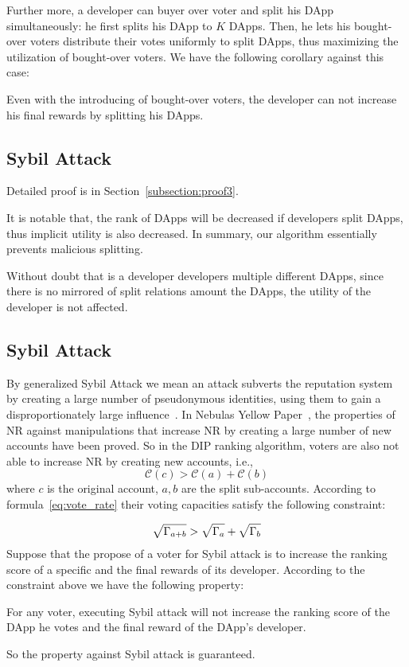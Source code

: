 Further more, a developer can buyer over voter and split his DApp simultaneously: he first splits his DApp to $K$ DApps. Then, he lets his bought-over voters distribute their votes uniformly to split DApps, thus  maximizing the utilization of  bought-over  voters. We have the following corollary against this case:
\begin{corollary}
	\label{c1}
	Even with the introducing of bought-over voters, the developer can not increase his final rewards by splitting his DApps.
\end{corollary}
\subsection{Sybil Attack}
Detailed proof is in Section~\ref{subsection:proof3}.

It is notable that, the rank of DApps will be decreased if developers split DApps, thus implicit utility is also decreased. In summary, our algorithm essentially prevents malicious splitting. 

Without doubt that is a developer developers multiple different  DApps, since there is no mirrored of split relations amount the DApps, the utility of the developer is not affected.

\subsection{Sybil Attack}
By generalized Sybil Attack we mean an attack subverts the reputation system by creating a large number of pseudonymous identities, using them to gain a disproportionately large influence~\cite{quercia2010sybil}. In Nebulas Yellow Paper~\cite{Nebulasyellowpaper}, the properties of NR against manipulations that increase NR by creating a large number of new accounts have been proved. So in the DIP ranking algorithm, voters are also not able to increase NR by creating new accounts, i.e.,
$$\mathcal{C}(c)>\mathcal{C}(a)+\mathcal{C}(b)$$
where $c$ is the original account, $a,b$ are the split sub-accounts. According to formula~\ref{eq:vote_rate} their voting capacities satisfy the following constraint: 

\begin{align}
	\label{eq:sqrt_nr}
	\sqrt{\Gamma_{a+b}}>\sqrt{\Gamma_a}+\sqrt{\Gamma_b}
\end{align}
Suppose that the propose of a voter for Sybil attack is to increase the ranking score of a specific and the final rewards of its developer. According to the constraint above we have the following property:

\begin{property}
	\label{p3}
    For any voter, executing Sybil attack will not increase the ranking score of the DApp he votes and the final reward of the DApp's developer. 	
\end{property}
So the property against Sybil attack is guaranteed.


